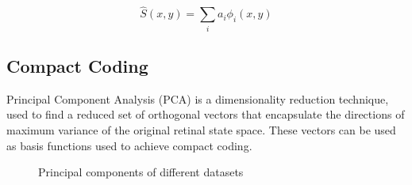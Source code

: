 \documentclass[journal]{IEEEtran}
\begin{document}
\begin{equation}
    \hat{S}(x,y) = \sum_i a_i \phi_i (x,y)
    \label{eq:image}
\end{equation}
\subsection{Compact Coding}
Principal Component Analysis (PCA) is a dimensionality reduction technique, used to find a reduced set of orthogonal vectors that encapsulate the directions of maximum variance of the original retinal state space. These vectors can be used as basis functions used to achieve compact coding.
\begin{figure}[htbp]
\centering     %
{}

\caption{Principal components of different datasets}
\end{figure}
\end{document}

